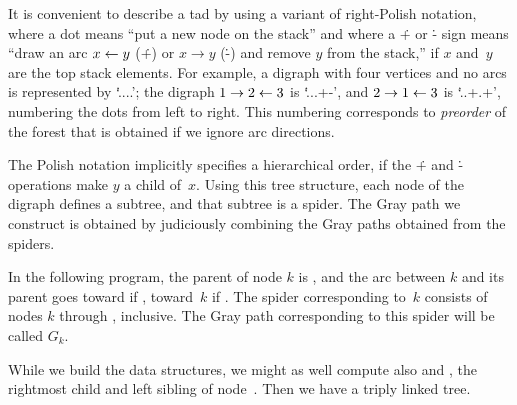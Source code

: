 It is convenient to describe a tad by using a variant
of right-Polish notation, where a dot means ``put a new node on the stack''
and where a \.+ or \.- sign means ``draw an arc $x\gets y$ (\.+) or
$x\to y$ (\.-) and remove $y$ from the stack,'' if $x$ and~$y$ are the
top stack elements. For example, a digraph with four vertices and no arcs is
represented by `\.{....}'; the digraph $1\to2\gets3$ is `\.{...+-}', and
$2\to1\gets 3$ is `\.{..+.+}', numbering the dots from left to right. This
numbering corresponds to {\it preorder\/} of the forest that is obtained if we
ignore arc directions.

The Polish notation implicitly specifies a hierarchical order, if the
\.+ and \.- operations make $y$ a child of~$x$. Using this tree structure,
each node of the digraph defines a subtree, and that subtree is a spider.
The Gray path we
construct is obtained by judiciously combining the Gray paths obtained
from the spiders.

\fi

In the following program, the parent of node $k$ is , and the
arc between $k$ and its parent goes toward  if ,
toward~$k$ if .
The spider corresponding to~$k$ consists of nodes $k$ through
, inclusive. The Gray path corresponding to this spider
will be called $G_k$.

While we build the data structures, we might as well compute also 
and , the rightmost child and left sibling of node~.
Then we
have a triply linked tree.

